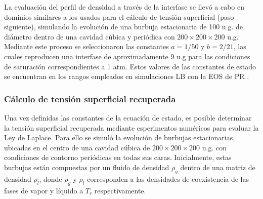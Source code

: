 La evaluaci\'on del perfil de densidad a trav\'es de la interfase se llev\'o a cabo en dominios similares a los usados para el c\'alculo de tensi\'on superficial (paso siguiente), simulando la evoluci\'on de una burbuja estacionaria de 100 u.g. de di\'ametro dentro de una cavidad c\'ubica y peri\'odica con $200 \times 200 \times 200$ u.g. Mediante este proceso se seleccionaron las constantes $a=1/50$ y $b=2/21$, las cuales reproducen una interfase de aproximadamente 9 u.g para las condiciones de saturaci\'on correspondientes a 1 atm. Estos valores de las constantes de estado se encuentran en los rangos empleados en simulaciones LB con la EOS de PR \cite{yuan_equations_2006}.



\subsubsection{C\'alculo de tensi\'on superficial recuperada}

Una vez definidas las constantes de la ecuaci\'on de estado, es posible determinar la tensi\'on superficial recuperada mediante esperimentos num\'ericos para evaluar la Ley de Laplace. Para ello se simul\'o la evoluci\'on de burbujas estacionarias, ubicadas en el centro de una cavidad c\'ubica de $200 \times 200 \times 200$ u.g. con condiciones de contorno peri\'odicas en todas sus caras. Inicialmente, estas burbujas est\'an compuestas por un fluido de densidad $\rho_g$ dentro de una matriz de densidad $\rho_l$, donde $\rho_g$ y $\rho_l$ corresponden a las densidades de coexistencia de las fases de vapor y l\'iquido a $T_r$ respectivamente.

